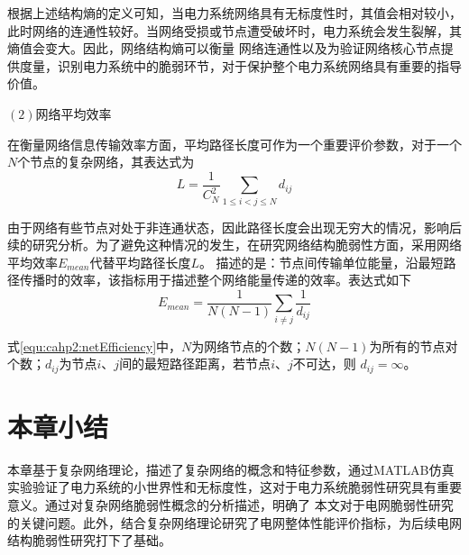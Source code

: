 根据上述结构熵的定义可知，当电力系统网络具有无标度性时，其值会相对较小，此时网络的连通性较好。当网络受损或节点遭受破坏时，电力系统会发生裂解，其熵值会变大。因此，网络结构熵可以衡量
网络连通性以及为验证网络核心节点提供度量，识别电力系统中的脆弱环节，对于保护整个电力系统网络具有重要的指导价值。

$(2)$网络平均效率

在衡量网络信息传输效率方面，平均路径长度可作为一个重要评价参数，对于一个$N$个节点的复杂网络，其表达式为
\begin{equation}
  L=\frac{1}{C_{N}^{2}} \sum_{1 \leq i<j \leq N} d_{i j}
\end{equation}

由于网络有些节点对处于非连通状态，因此路径长度会出现无穷大的情况，影响后续的研究分析。为了避免这种情况的发生，在研究网络结构脆弱性方面，采用网络平均效率$E_{mean}$代替平均路径长度$L$。
描述的是：节点间传输单位能量，沿最短路径传播时的效率，该指标用于描述整个网络能量传递的效率。表达式如下
\begin{equation}
\label{equ:cahp2:netEfficiency}
  E_{mean}=\frac{1}{N(N-1)} \sum_{i \neq j} \frac{1}{d_{i j}}
\end{equation}

式\ref{equ:cahp2:netEfficiency}中，$N$为网络节点的个数；$N(N-1)$为所有的节点对个数；$d_{ij}$为节点$i$、$j$间的最短路径距离，若节点$i$、$j$不可达，则 $d_{i j}=\infty$。

\section{本章小结}
\label{sec:sum2}
本章基于复杂网络理论，描述了复杂网络的概念和特征参数，通过MATLAB仿真实验验证了电力系统的小世界性和无标度性，这对于电力系统脆弱性研究具有重要意义。通过对复杂网络脆弱性概念的分析描述，明确了
本文对于电网脆弱性研究的关键问题。此外，结合复杂网络理论研究了电网整体性能评价指标，为后续电网结构脆弱性研究打下了基础。




